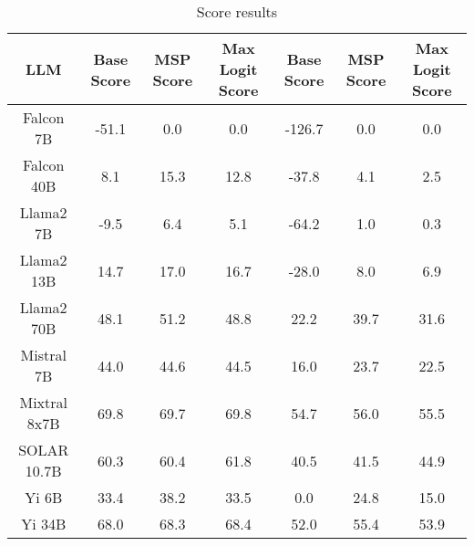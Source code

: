 \renewcommand\arraystretch{1.2}
\begin{table*}
\centering
\begin{tabular}{c|c|c|c|c|c|c}
LLM & Base Score & MSP Score & Max Logit Score & Base Score & MSP Score & Max Logit Score\\ \hline
Falcon 7B & -51.1 & 0.0 & 0.0 & -126.7 & 0.0 & 0.0\\
Falcon 40B & 8.1 & 15.3 & 12.8 & -37.8 & 4.1 & 2.5\\
Llama2 7B & -9.5 & 6.4 & 5.1 & -64.2 & 1.0 & 0.3\\
Llama2 13B & 14.7 & 17.0 & 16.7 & -28.0 & 8.0 & 6.9\\
Llama2 70B & 48.1 & 51.2 & 48.8 & 22.2 & 39.7 & 31.6\\
Mistral 7B & 44.0 & 44.6 & 44.5 & 16.0 & 23.7 & 22.5\\
Mixtral 8x7B & 69.8 & 69.7 & 69.8 & 54.7 & 56.0 & 55.5\\
SOLAR 10.7B & 60.3 & 60.4 & 61.8 & 40.5 & 41.5 & 44.9\\
Yi 6B & 33.4 & 38.2 & 33.5 & 0.0 & 24.8 & 15.0\\
Yi 34B & 68.0 & 68.3 & 68.4 & 52.0 & 55.4 & 53.9\\
\hline
\end{tabular}
\caption{Score results}
\end{table*}
\label{tab:score}
